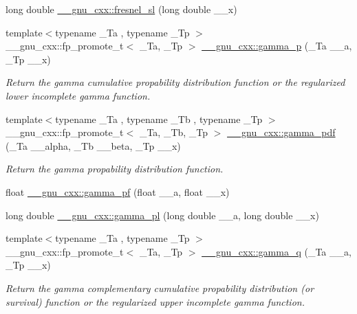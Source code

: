 \begin{DoxyCompactItemize}
\item 
long double \hyperlink{group__mathsf__gnu_ga5d6ac976fa316df9b943f92bafe1407d}{\+\_\+\+\_\+gnu\+\_\+cxx\+::fresnel\+\_\+sl} (long double \+\_\+\+\_\+x)
\item 
{\footnotesize template$<$typename \+\_\+\+Ta , typename \+\_\+\+Tp $>$ }\\\+\_\+\+\_\+gnu\+\_\+cxx\+::fp\+\_\+promote\+\_\+t$<$ \+\_\+\+Ta, \+\_\+\+Tp $>$ \hyperlink{group__mathsf__gnu_ga692601fa7508c0b97bf549e6362a49b9}{\+\_\+\+\_\+gnu\+\_\+cxx\+::gamma\+\_\+p} (\+\_\+\+Ta \+\_\+\+\_\+a, \+\_\+\+Tp \+\_\+\+\_\+x)
\begin{DoxyCompactList}\small\item\em Return the gamma cumulative propability distribution function or the regularized lower incomplete gamma function. \end{DoxyCompactList}\item 
{\footnotesize template$<$typename \+\_\+\+Ta , typename \+\_\+\+Tb , typename \+\_\+\+Tp $>$ }\\\+\_\+\+\_\+gnu\+\_\+cxx\+::fp\+\_\+promote\+\_\+t$<$ \+\_\+\+Ta, \+\_\+\+Tb, \+\_\+\+Tp $>$ \hyperlink{group__mathsf__gnu_ga55f530c37387a6c10c601c5838f3be00}{\+\_\+\+\_\+gnu\+\_\+cxx\+::gamma\+\_\+pdf} (\+\_\+\+Ta \+\_\+\+\_\+alpha, \+\_\+\+Tb \+\_\+\+\_\+beta, \+\_\+\+Tp \+\_\+\+\_\+x)
\begin{DoxyCompactList}\small\item\em Return the gamma propability distribution function. \end{DoxyCompactList}\item 
float \hyperlink{group__mathsf__gnu_gac9a59be05877d3c14fa95bebcf15e8df}{\+\_\+\+\_\+gnu\+\_\+cxx\+::gamma\+\_\+pf} (float \+\_\+\+\_\+a, float \+\_\+\+\_\+x)
\item 
long double \hyperlink{group__mathsf__gnu_gaa37f4adf9942ce8e095f440963b330a6}{\+\_\+\+\_\+gnu\+\_\+cxx\+::gamma\+\_\+pl} (long double \+\_\+\+\_\+a, long double \+\_\+\+\_\+x)
\item 
{\footnotesize template$<$typename \+\_\+\+Ta , typename \+\_\+\+Tp $>$ }\\\+\_\+\+\_\+gnu\+\_\+cxx\+::fp\+\_\+promote\+\_\+t$<$ \+\_\+\+Ta, \+\_\+\+Tp $>$ \hyperlink{group__mathsf__gnu_ga10c246b2fa2ce000dc5d7c81e9e98c58}{\+\_\+\+\_\+gnu\+\_\+cxx\+::gamma\+\_\+q} (\+\_\+\+Ta \+\_\+\+\_\+a, \+\_\+\+Tp \+\_\+\+\_\+x)
\begin{DoxyCompactList}\small\item\em Return the gamma complementary cumulative propability distribution (or survival) function or the regularized upper incomplete gamma function. \end{DoxyCompactList}\item 

\end{DoxyCompactItemize}
